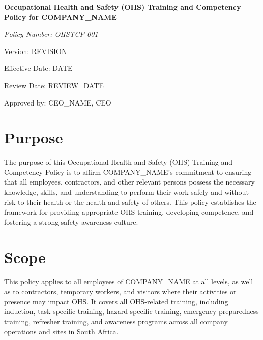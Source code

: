 \documentclass[12pt]{article}
\begin{document}
\begin{titlepage}
    \centering
    \vspace*{2cm}
    {\LARGE\bfseries Occupational Health and Safety (OHS) Training and Competency Policy for {{COMPANY_NAME}}\par}
    \vspace{1cm}
    {\large\itshape Policy Number: OHSTCP-001\par}
    \vspace{0.5cm}
    {\normalsize Version: {{REVISION}}\par}
    \vspace{0.5cm}
    {\normalsize Effective Date: {{DATE}}\par}
    \vspace{0.5cm}
    {\normalsize Review Date: {{REVIEW_DATE}}\par}
    \vspace{2cm}
    {\normalsize Approved by: {{CEO_NAME}}, CEO\par}
\end{titlepage}

\section{Purpose}
The purpose of this Occupational Health and Safety (OHS) Training and Competency Policy is to affirm {{COMPANY_NAME}}'s commitment to ensuring that all employees, contractors, and other relevant persons possess the necessary knowledge, skills, and understanding to perform their work safely and without risk to their health or the health and safety of others. This policy establishes the framework for providing appropriate OHS training, developing competence, and fostering a strong safety awareness culture.

\section{Scope}
This policy applies to all employees of {{COMPANY_NAME}} at all levels, as well as to contractors, temporary workers, and visitors where their activities or presence may impact OHS. It covers all OHS-related training, including induction, task-specific training, hazard-specific training, emergency preparedness training, refresher training, and awareness programs across all company operations and sites in South Africa.
\end{document}
